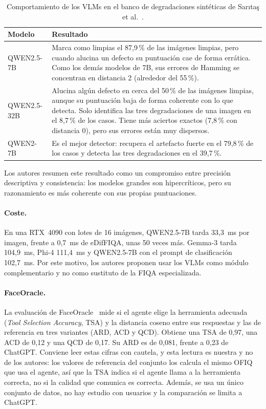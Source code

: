 \begin{table}[htbp]
\centering\small
\caption{Comportamiento de los VLMs en el banco de degradaciones sintéticas de Sarıtaş et al.~\cite{Saritas_2026_FG}.}
\label{tab:alucinaciones}
\begin{tabularx}{\linewidth}{@{}lX@{}}
\toprule
Modelo & Resultado \\
\midrule
QWEN2.5-7B & Marca como limpias el 87,9\,\% de las imágenes limpias, pero cuando alucina un defecto su puntuación cae de forma errática. Como los demás modelos de 7B, sus errores de Hamming se concentran en distancia 2 (alrededor del 55\,\%). \\
QWEN2.5-32B & Alucina algún defecto en cerca del 50\,\% de las imágenes limpias, aunque su puntuación baja de forma coherente con lo que detecta. Solo identifica las tres degradaciones de una imagen en el 8,7\,\% de los casos. Tiene más aciertos exactos (7,8\,\% con distancia 0), pero sus errores están muy dispersos. \\
QWEN2-7B & Es el mejor detector: recupera el artefacto fuerte en el 79,8\,\% de los casos y detecta las tres degradaciones en el 39,7\,\%. \\
\bottomrule
\end{tabularx}
\end{table}

Los autores resumen este resultado como un compromiso entre precisión descriptiva y consistencia: los modelos grandes son hipercríticos, pero su razonamiento es más coherente con sus propias puntuaciones.

\paragraph{Coste.} En una RTX~4090 con lotes de 16 imágenes, QWEN2.5-7B tarda 33,3~ms por imagen, frente a 0,7~ms de eDifFIQA, unas 50 veces más. Gemma-3 tarda 104,9~ms, Phi-4 111,4~ms y QWEN2.5-7B con el prompt de clasificación 102,7~ms. Por este motivo, los autores proponen usar los VLMs como módulo complementario y no como sustituto de la FIQA especializada.

\paragraph{FaceOracle.} La evaluación de FaceOracle~\cite{Kabbani_2024_ECCVW} mide si el agente elige la herramienta adecuada (\textit{Tool Selection Accuracy}, TSA) y la distancia coseno entre sus respuestas y las de referencia en tres variantes (ARD, ACD y QCD). Obtiene una TSA de 0,97, una ACD de 0,12 y una QCD de 0,17. Su ARD es de 0,081, frente a 0,23 de ChatGPT. Conviene leer estas cifras con cautela, y esta lectura es nuestra y no de los autores: los valores de referencia del conjunto los calcula el mismo OFIQ que usa el agente, así que la TSA indica si el agente llama a la herramienta correcta, no si la calidad que comunica es correcta. Además, se usa un único conjunto de datos, no hay estudio con usuarios y la comparación se limita a ChatGPT.

